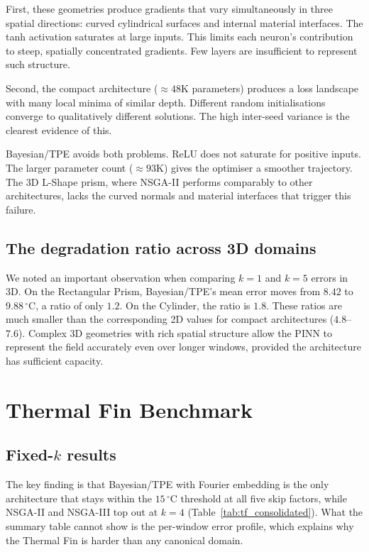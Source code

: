 First, these geometries produce gradients that vary simultaneously in three
spatial directions: curved cylindrical surfaces and internal material interfaces.
The tanh activation saturates at large inputs.
This limits each neuron's contribution to steep, spatially concentrated gradients.
Few layers are insufficient to represent such structure.

Second, the compact architecture (${\approx}48$K parameters) produces a loss
landscape with many local minima of similar depth.
Different random initialisations converge to qualitatively different solutions.
The high inter-seed variance is the clearest evidence of this.

Bayesian/TPE avoids both problems.
ReLU does not saturate for positive inputs.
The larger parameter count (${\approx}93$K) gives the optimiser a smoother
trajectory.
The 3D L-Shape prism, where NSGA-II performs comparably to other architectures,
lacks the curved normals and material interfaces that trigger this failure.

\subsection{The degradation ratio across 3D domains}

We noted an important observation when comparing $k=1$ and $k=5$ errors in 3D.
On the Rectangular Prism, Bayesian/TPE's mean error moves from $8.42$ to
$9.88\,^\circ\mathrm{C}$, a ratio of only $1.2$.
On the Cylinder, the ratio is $1.8$.
These ratios are much smaller than the corresponding 2D values for compact
architectures ($4.8$--$7.6$).
Complex 3D geometries with rich spatial structure allow the PINN to represent
the field accurately even over longer windows, provided the architecture has
sufficient capacity.

\section{Thermal Fin Benchmark}
\label{sec:disc_thermalfin}

\subsection{Fixed-$k$ results}

The key finding is that Bayesian/TPE with Fourier embedding is the only
architecture that stays within the $15\,^\circ\mathrm{C}$ threshold at all
five skip factors, while NSGA-II and NSGA-III top out at $k=4$
(Table~\ref{tab:tf_consolidated}).
What the summary table cannot show is the per-window error profile, which
explains why the Thermal Fin is harder than any canonical domain.

